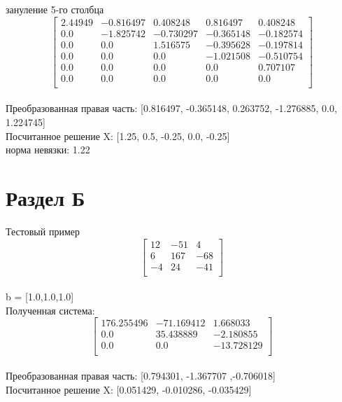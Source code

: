 \documentclass[13pt,a4paper]{scrartcl}
\begin{document}
зануление 5-го столбца\\[5pt]
$$
\left[
\begin{array}{ccccc}
2.44949& -0.816497& 0.408248& 0.816497& 0.408248\\
0.0& -1.825742&  -0.730297& -0.365148& -0.182574\\
0.0& 0.0&  1.516575& -0.395628& -0.197814\\
0.0& 0.0&  0.0& -1.021508& -0.510754\\
0.0& 0.0&  0.0& 0.0& 0.707107\\
0.0& 0.0&  0.0& 0.0& 0.0\\
\end{array}
\right]
$$\\
Преобразованная правая часть: [0.816497, -0.365148, 0.263752, -1.276885, 0.0, 1.224745]\\
Посчитанное решение X: [1.25, 0.5, -0.25, 0.0, -0.25]\\
норма невязки: 1.22\\



\section{Раздел Б}
Тестовый пример\\[10pt]
$$
\left[
\begin{array}{ccc}
12& -51& 4\\
6& 167& -68\\
-4& 24& -41\\
\end{array}
\right]
$$\\
b = [1.0,1.0,1.0]\\


Полученная система:\\
$$
\left[
\begin{array}{ccc}
176.255496& -71.169412& 1.668033\\
0.0& 35.438889& -2.180855\\
0.0& 0.0& -13.728129\\
\end{array}
\right]
$$\\
Преобразованная правая часть: [0.794301, -1.367707 ,-0.706018]\\
Посчитанное решение X: [0.051429, -0.010286, -0.035429]\\
\end{document}
